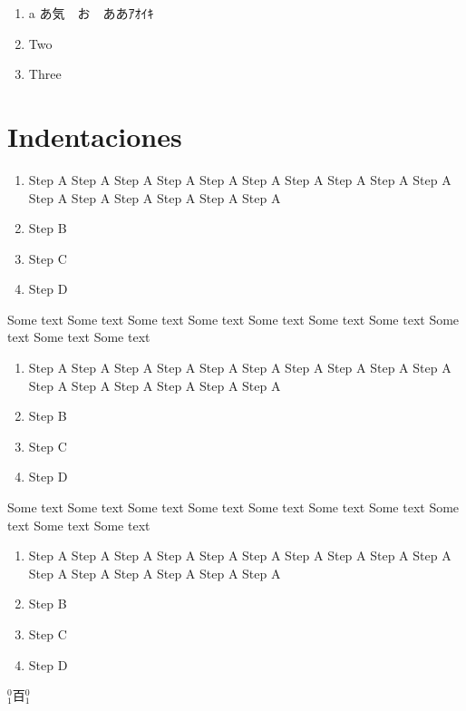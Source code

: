 \documentclass[]{article}
\begin{document}
\begin{enumerate}[label=\roman*]
  \item {\ene a あ気　お　ああｱｵｲｷ}
  \item Two
  \item Three
\end{enumerate}
\section{Indentaciones}
\begin{enumerate} [label=Step \arabic{enumi}.,ref=Step \arabic{enumi}, leftmargin=*]
\item Step A Step A Step A Step A Step A Step A Step A Step A Step A Step A Step A Step A Step A Step A Step A Step A
\item Step B
\item Step C
\item Step D
\end{enumerate}

\noindent
Some text Some text Some text Some text Some text Some text Some text Some text Some text Some text

\begin{enumerate} [label=Step \arabic{enumi}.,ref=Step \arabic{enumi}, wide=0pt]
\item Step A Step A Step A Step A Step A Step A Step A Step A Step A Step A Step A Step A Step A Step A Step A Step A
\item Step B
\item Step C
\item Step D
\end{enumerate}

\noindent
Some text Some text Some text Some text Some text Some text Some text Some text Some text Some text

\begin{enumerate} [label=Step \arabic{enumi}.,ref=Step \arabic{enumi}, align=left]
\item Step A Step A Step A Step A Step A Step A Step A Step A Step A Step A Step A Step A Step A Step A Step A Step A
\item Step B
\item Step C
\item Step D
\end{enumerate}
$_{1}^{0}${\ene 百}$_{1}^{0}$
\pagebreak

\pagebreak
%
\printindex[fon]
\printindex[esquinas]
\end{document}
